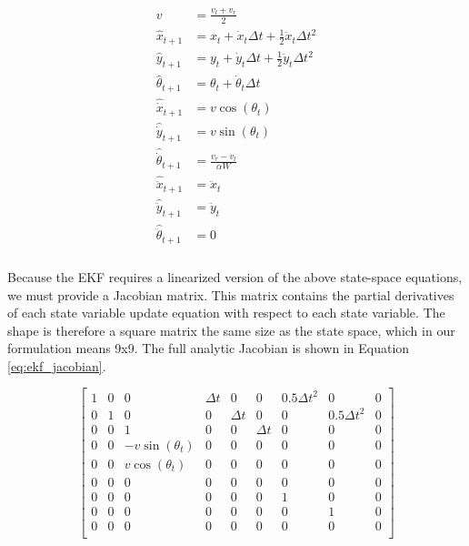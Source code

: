 \documentclass{article}
\begin{document}
    \begin{align} \label{eq:ekf_prediction}
      \begin{split}
        v &= \frac{v_l + v_r}{2} \\
        \hat{x}_{t+1} &= x_t + \dot{x}_t\Delta t + \tfrac{1}{2}\ddot{x}_t\Delta t^2 \\
        \hat{y}_{t+1} &= y_t + \dot{y}_t\Delta t + \tfrac{1}{2}\ddot{y}_t\Delta t^2 \\
        \hat{\theta}_{t+1} &= \theta_t + \dot{\theta}_t\Delta t \\
        \hat{\dot{x}}_{t+1} &= v\cos(\theta_t) \\
        \hat{\dot{y}}_{t+1} &= v\sin(\theta_t) \\
        \hat{\dot{\theta}}_{t+1} &= \frac{v_r - v_l}{\alpha W} \\
        \hat{\ddot{x}}_{t+1} &=  \ddot{x}_{t} \\
        \hat{\ddot{y}}_{t+1} &=  \ddot{y}_{t} \\
        \hat{\ddot{\theta}}_{t+1} &= 0 \\
      \end{split}
    \end{align}

    Because the EKF requires a linearized version of the above state-space equations, we must provide a Jacobian matrix. This matrix contains the partial derivatives of each state variable update equation with respect to each state variable. The shape is therefore a square matrix the same size as the state space, which in our formulation means 9x9. The full analytic Jacobian is shown in Equation \ref{eq:ekf_jacobian}.

    \begin{equation} \label{eq:ekf_jacobian}
      \begin{bmatrix}
        1 & 0 & 0 & \Delta t & 0 & 0 & 0.5\Delta t^2 & 0 & 0 \\
        0 & 1 & 0 & 0 & \Delta t & 0 & 0 & 0.5\Delta t^2 & 0 \\
        0 & 0 & 1 & 0 & 0 & \Delta t & 0 & 0 & 0 \\
        0 & 0 & -v\sin(\theta_t) & 0 & 0 & 0 & 0 & 0 & 0 \\
        0 & 0 & v\cos(\theta_t) & 0 & 0 & 0 & 0 & 0 & 0 \\
        0 & 0 & 0 & 0 & 0 & 0 & 0 & 0 & 0 \\
        0 & 0 & 0 & 0 & 0 & 0 & 1 & 0 & 0 \\
        0 & 0 & 0 & 0 & 0 & 0 & 0 & 1 & 0 \\
        0 & 0 & 0 & 0 & 0 & 0 & 0 & 0 & 0 \\
      \end{bmatrix}
    \end{equation}
\end{document}
